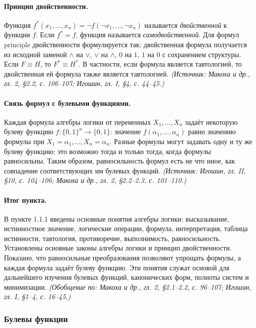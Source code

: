 \documentclass[a4paper,12pt]{article}
\begin{document}
\paragraph{Принцип двойственности.}
Функция \(f^*(x_1,\ldots,x_n)=\neg f(\neg x_1,\ldots,\neg x_n)\) называется \emph{двойственной} к функции \(f\). Если \(f^*=f\), функция называется \emph{самодвойственной}. Для формул principle двойственности формулируется так: двойственная формула получается из исходной заменой \(\land\) на \(\lor\), \(\lor\) на \(\land\), \(0\) на \(1\), \(1\) на \(0\) с сохранением структуры. Если \(F\equiv H\), то \(F^*\equiv H^*\). В частности, если формула является тавтологией, то двойственная ей формула также является тавтологией.
\textit{(Источник: Макоха и др., гл. 2, §2.2, с. 106--107; Игошин, гл. I, §4, с. 44--45.)}

\paragraph{Связь формул с булевыми функциями.}
Каждая формула алгебры логики от переменных \(X_1,\ldots,X_n\) задаёт некоторую булеву функцию \(f:\{0,1\}^n\to\{0,1\}\): значение \(f(\alpha_1,\ldots,\alpha_n)\) равно значению формулы при \(X_1=\alpha_1,\ldots,X_n=\alpha_n\). Разные формулы могут задавать одну и ту же булеву функцию; это возможно тогда и только тогда, когда формулы равносильны. Таким образом, равносильность формул есть не что иное, как совпадение соответствующих им булевых функций.
\textit{(Источник: Игошин, гл. II, §10, с. 104--106; Макоха и др., гл. 2, §2.2--2.3, с. 101--110.)}

\paragraph{Итог пункта.}
В пункте 1.1.1 введены основные понятия алгебры логики: высказывание, истинностное значение, логические операции, формула, интерпретация, таблица истинности, тавтология, противоречие, выполнимость, равносильность. Установлены основные законы алгебры логики и принцип двойственности. Показано, что равносильные преобразования позволяют упрощать формулы, а каждая формула задаёт булеву функцию. Эти понятия служат основой для дальнейшего изучения булевых функций, канонических форм, полноты систем и минимизации.
\textit{(Обобщение по: Макоха и др., гл. 2, §2.1--2.2, с. 96--107; Игошин, гл. I, §1--4, с. 16--45.)}

\subsubsection{Булевы функции}
\end{document}
